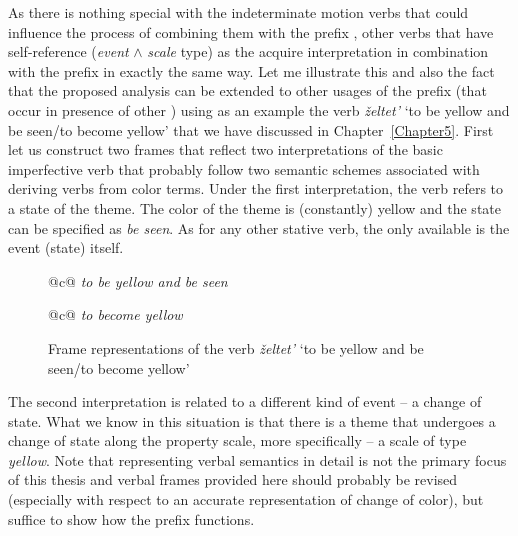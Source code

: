 As there is nothing special with the indeterminate motion verbs that could influence the process of combining them with the prefix , other verbs that have self-reference (\textit{event} $\wedge$ \textit{scale} type) as the  acquire  interpretation in combination with the prefix  in exactly the same way. Let me illustrate this and also the fact that the proposed analysis can be extended to other usages of the prefix  (that occur in presence of other ) using as an example the verb \textit{\v{z}eltet'} `to be yellow and be seen/to become yellow' that we have discussed in Chapter~\ref{Chapter5}. First let us construct two frames that reflect two interpretations of the basic imperfective verb that probably follow two semantic schemes associated with deriving verbs from color terms. Under the first interpretation, the verb refers to a state of the theme. The color of the theme is (constantly) yellow and the state can be specified as \textit{be seen}. As for any other stative verb, the only available  is the event (state) itself. 

\begin{figure}\small
\begin{tabular}[t]{@{}c@{}}
\textit{to be yellow and be seen}\\
\end{tabular}\hfill\begin{tabular}[t]{@{}c@{}}
\textit{to become yellow}\\
\end{tabular}
\caption{Frame representations of the verb \textit{\v{z}eltet'} `to be yellow and be seen/to become yellow' \label{frame:zeltet}}
\end{figure}

The second interpretation is related to a different kind of event -- a change of state. What we know in this situation is that there is a theme that undergoes a change of state along the property scale, more specifically -- a scale of type \textit{yellow}. Note that representing verbal semantics in detail is not the primary focus of this thesis and verbal frames provided here should probably be revised (especially with respect to an accurate representation of change of color), but suffice to show how the prefix  functions.

